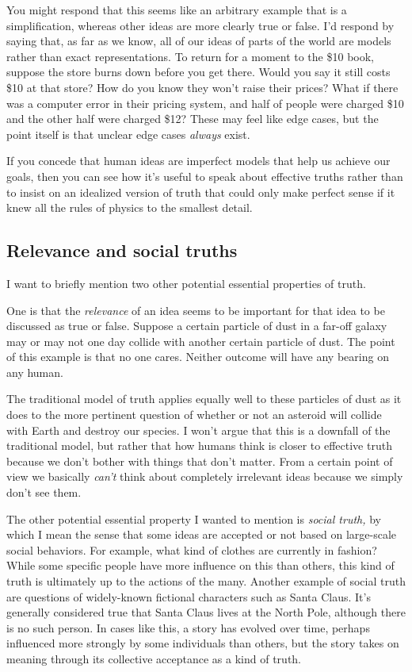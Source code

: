 \documentclass[20pt,]{extarticle}
\begin{document}
You might respond that this seems like an arbitrary example that is a
simplification, whereas other ideas are more clearly true or false. I'd
respond by saying that, as far as we know, all of our ideas of parts of
the world are models rather than exact representations. To return for a
moment to the \$10 book, suppose the store burns down before you get
there. Would you say it still costs \$10 at that store? How do you know
they won't raise their prices? What if there was a computer error in
their pricing system, and half of people were charged \$10 and the other
half were charged \$12? These may feel like edge cases, but the point
itself is that unclear edge cases \emph{always} exist.

If you concede that human ideas are imperfect models that help us
achieve our goals, then you can see how it's useful to speak about
effective truths rather than to insist on an idealized version of truth
that could only make perfect sense if it knew all the rules of physics
to the smallest detail.

\subsection{Relevance and social
truths}\label{relevance-and-social-truths}

I want to briefly mention two other potential essential properties of
truth.

One is that the \emph{relevance} of an idea seems to be important for
that idea to be discussed as true or false. Suppose a certain particle
of dust in a far-off galaxy may or may not one day collide with another
certain particle of dust. The point of this example is that no one
cares. Neither outcome will have any bearing on any human.

The traditional model of truth applies equally well to these particles
of dust as it does to the more pertinent question of whether or not an
asteroid will collide with Earth and destroy our species. I won't argue
that this is a downfall of the traditional model, but rather that how
humans think is closer to effective truth because we don't bother with
things that don't matter. From a certain point of view we basically
\emph{can't} think about completely irrelevant ideas because we simply
don't see them.

The other potential essential property I wanted to mention is
\emph{social truth,} by which I mean the sense that some ideas are
accepted or not based on large-scale social behaviors. For example, what
kind of clothes are currently in fashion? While some specific people
have more influence on this than others, this kind of truth is
ultimately up to the actions of the many. Another example of social
truth are questions of widely-known fictional characters such as Santa
Claus. It's generally considered true that Santa Claus lives at the
North Pole, although there is no such person. In cases like this, a
story has evolved over time, perhaps influenced more strongly by some
individuals than others, but the story takes on meaning through its
collective acceptance as a kind of truth.
\end{document}
